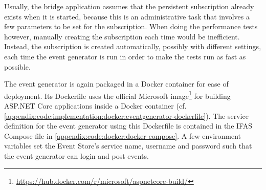 Usually, the bridge application assumes that the persistent subscription already exists when it is started, because this is an administrative task that involves a few parameters to be set for the subscription.
When doing the performance tests however, manually creating the subscription each time would be inefficient.
Instead, the subscription is created automatically, possibly with different settings, each time the event generator is run in order to make the tests run as fast as possible.

The event generator is again packaged in a Docker container for ease of deployment.
Its Dockerfile uses the official Microsoft image\footnote{\url{https://hub.docker.com/r/microsoft/aspnetcore-build/}} for building ASP.NET Core applications inside a Docker container (cf. \cref{appendix:code:implementation:docker:eventgenerator-dockerfile}).
The service definition for the event generator using this Dockerfile is contained in the \ac{IFAS} Compose file in \cref{appendix:code:docker:docker-compose}.
A few environment variables set the Event Store's service name, username and password such that the event generator can login and post events.

